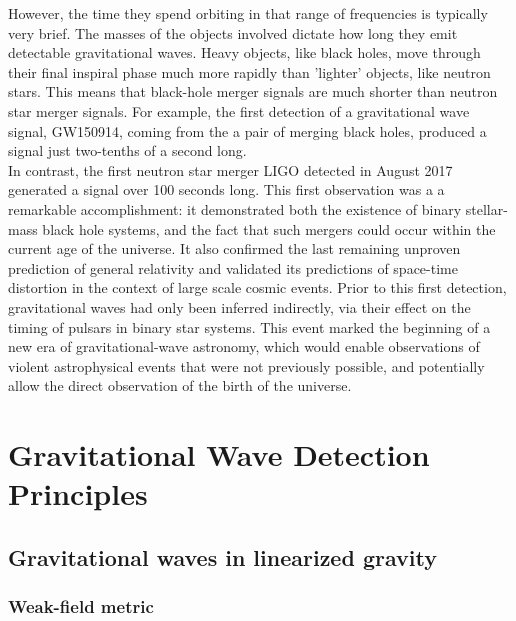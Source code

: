 \documentclass[binding=0.6cm, LaM]{sapthesis}
\begin{document}
	However, the time they spend orbiting in that range of frequencies is typically very brief.
        The masses of the objects involved dictate how long they emit detectable gravitational waves. 
        Heavy objects, like black holes, move through their final inspiral phase much more rapidly than 'lighter' objects, 
        like neutron stars. This means that black-hole merger signals are much shorter than neutron star merger signals.
        For example, the first detection of a gravitational wave signal, GW150914, coming from the a pair of merging black holes, 
	produced a signal just two-tenths of a second long. \\
        In contrast, the first neutron star merger LIGO detected in August 2017 generated a signal over 100 seconds long.
	This first observation was a a remarkable accomplishment: it demonstrated both the existence of binary stellar-mass black hole systems, 
	and the fact that such mergers could occur within the current age of the universe.  
	It also confirmed the last remaining unproven prediction of general relativity and validated 
	its predictions of space-time distortion in the context of large scale cosmic events. 
	Prior to this first detection, gravitational waves had only been inferred indirectly,
        via their effect on the timing of pulsars in binary star systems.
	This event  marked the beginning of a new era of gravitational-wave astronomy, 
	which would enable observations of violent astrophysical events that were not previously possible, 
	and potentially allow the direct observation of the birth of the universe.


\chapter{Gravitational Wave Detection Principles}
\section{Gravitational waves in linearized gravity}

\subsection{Weak-field metric}
\end{document}
